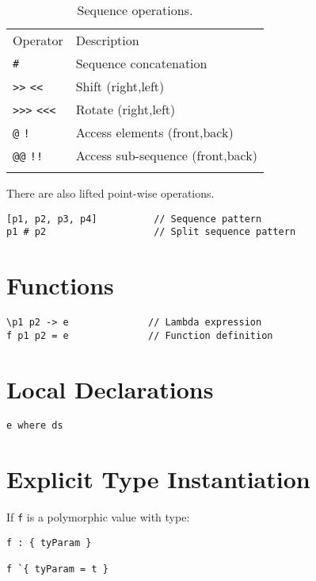 \begin{longtable}[c]{@{}ll@{}}
\toprule\addlinespace
Operator & Description
\\\addlinespace
\midrule\endhead
\texttt{\#} & Sequence concatenation
\\\addlinespace
\texttt{\textgreater{}\textgreater{}} \texttt{\textless{}\textless{}} &
Shift (right,left)
\\\addlinespace
\texttt{\textgreater{}\textgreater{}\textgreater{}}
\texttt{\textless{}\textless{}\textless{}} & Rotate (right,left)
\\\addlinespace
\texttt{@} \texttt{!} & Access elements (front,back)
\\\addlinespace
\texttt{@@} \texttt{!!} & Access sub-sequence (front,back)
\\\addlinespace
\bottomrule
\addlinespace
\caption{Sequence operations.}
\end{longtable}

There are also lifted point-wise operations.

\begin{verbatim}
[p1, p2, p3, p4]          // Sequence pattern
p1 # p2                   // Split sequence pattern
\end{verbatim}

\section{Functions}\label{functions}

\begin{verbatim}
\p1 p2 -> e              // Lambda expression
f p1 p2 = e              // Function definition
\end{verbatim}

\section{Local Declarations}\label{local-declarations}

\begin{verbatim}
e where ds
\end{verbatim}

\section{Explicit Type Instantiation}\label{explicit-type-instantiation}

If \texttt{f} is a polymorphic value with type:

\begin{verbatim}
f : { tyParam }

f `{ tyParam = t }
\end{verbatim}

